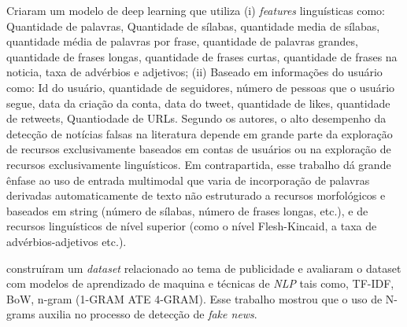 \citet{Mouratidis20211} Criaram um modelo de deep learning que utiliza (i) \textit{features} linguísticas como: Quantidade de palavras, Quantidade de sílabas, quantidade media de sílabas, quantidade média de palavras por frase, quantidade de palavras grandes, quantidade de frases longas, quantidade de frases curtas, quantidade de frases na noticia, taxa de advérbios e adjetivos; (ii) Baseado em informações do usuário como: Id do usuário, quantidade de seguidores, número de pessoas que o usuário segue, data da criação da conta, data do tweet, quantidade de likes, quantidade de retweets, Quantiodade de URLs. Segundo os autores, o alto desempenho da detecção de notícias falsas na literatura depende em grande parte da exploração de recursos exclusivamente baseados em contas de usuários ou na exploração de recursos exclusivamente linguísticos. Em contrapartida, esse trabalho dá grande ênfase ao uso de entrada multimodal que varia de incorporação de palavras derivadas automaticamente de texto não estruturado a recursos morfológicos e baseados em string (número de sílabas, número de frases longas, etc.), e de recursos linguísticos de nível superior (como o nível Flesh-Kincaid, a taxa de advérbios-adjetivos etc.).

\citet{Setiawan2021} construíram um \textit{dataset} relacionado ao tema de publicidade e avaliaram o dataset com modelos de aprendizado de maquina e técnicas de \textit{NLP} tais como, TF-IDF, BoW, n-gram (1-GRAM ATE 4-GRAM). 
Esse trabalho mostrou que o uso de N-grams auxilia no processo de detecção de \textit{fake news}.


